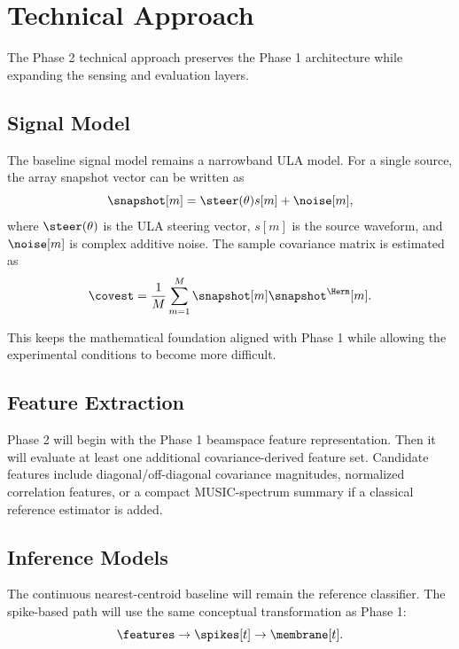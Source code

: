 \section{Technical Approach}

The Phase 2 technical approach preserves the Phase 1 architecture while expanding the sensing and evaluation layers.

\subsection{Signal Model}

The baseline signal model remains a narrowband ULA model. For a single source, the array snapshot vector can be written as
\begin{equation}
    \snapshot[m] = \steer(\theta)s[m] + \noise[m],
\end{equation}
where \(\steer(\theta)\) is the ULA steering vector, \(s[m]\) is the source waveform, and \(\noise[m]\) is complex additive noise. The sample covariance matrix is estimated as
\begin{equation}
    \covest = \frac{1}{M}\sum_{m=1}^{M}\snapshot[m]\snapshot^{\Herm}[m].
\end{equation}

This keeps the mathematical foundation aligned with Phase 1 while allowing the experimental conditions to become more difficult.

\subsection{Feature Extraction}

Phase 2 will begin with the Phase 1 beamspace feature representation. Then it will evaluate at least one additional covariance-derived feature set. Candidate features include diagonal/off-diagonal covariance magnitudes, normalized correlation features, or a compact MUSIC-spectrum summary if a classical reference estimator is added.

\subsection{Inference Models}

The continuous nearest-centroid baseline will remain the reference classifier. The spike-based path will use the same conceptual transformation as Phase 1:
\begin{equation}
    \features \rightarrow \spikes[t] \rightarrow \membrane[t].
\end{equation}


